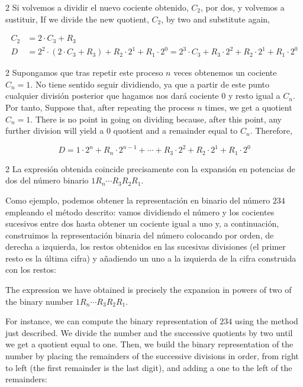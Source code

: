 \begin{paracol}{2}
Si volvemos a dividir el nuevo cociente obtenido, $C_2$, por dos, y volvemos a sustituir,
\switchcolumn
If we divide the new quotient, $C_2$, by two and substitute again,
\end{paracol}
 \begin{align*}
C_2&=2\cdot C_3+R_3 \\
D&=2^2\cdot(2\cdot C_3+R_3)+R_2\cdot 2^1+R_1\cdot 2^0=2^3\cdot C_3+R_3\cdot 2^2 +R_2\cdot 2^1+R_1\cdot 2^0
\end{align*}
\begin{paracol}{2}
Supongamos que tras repetir este proceso $n$ veces obtenemos un cociente $C_n=1$. No tiene sentido seguir dividiendo, ya que a partir de este punto cualquier división posterior que hagamos nos dará cociente $0$ y resto igual a $C_n$. Por tanto,
\switchcolumn
Suppose that, after repeating the process $n$ times, we get a quotient $C_n=1$. There is no point in going on dividing because, after this point, any further division will yield a $0$ quotient and a remainder equal to $C_n$. Therefore,
\end{paracol}
 \begin{equation*}
D=1\cdot 2^n+R_n\cdot 2^{n-1}+\cdots +R_3\cdot 2^2 +R_2\cdot 2^1+R_1\cdot 2^0
\end{equation*}
\begin{paracol}{2}
La expresión obtenida coincide precisamente con la expansión en potencias de dos del número binario $1R_n \cdots R_3R_2R_1$.

Como ejemplo, podemos obtener la representación en binario del número $234$ empleando el método descrito: vamos dividiendo el número y los cocientes sucesivos entre dos hasta obtener un cociente igual a uno y, a continuación, construimos la representación binaria del número colocando por orden, de derecha a izquierda, los restos obtenidos en las sucesivas divisiones (el primer resto es la última cifra) y añadiendo un uno a la izquierda de la cifra construida con los restos:

\switchcolumn
The expression we have obtained is precisely the expansion in powers of two of the binary number $1R_n\cdots R_3R_2R_1$.

For instance, we can compute the binary representation of $234$ using the method just described. We divide the number and the successive quotients by two until we get a quotient equal to one. Then, we build the binary representation of the number by placing the remainders of the successive divisions in order, from right to left (the first remainder is the last digit), and adding a one to the left of the remainders:
\end{paracol}
